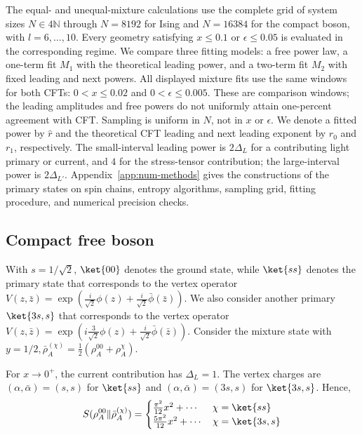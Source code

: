\documentclass[11pt]{article}
\newcommand{\ep}{\epsilon}
\newcommand{\lb}{\left(}
\newcommand{\rb}{\right)}
\begin{document}
The equal- and unequal-mixture calculations use the complete grid of system sizes
$N\in4\mathbb N$ through $N=8192$ for Ising and $N=16384$ for
the compact boson, with $l=6,\ldots,10$. Every geometry satisfying
$x\leq0.1$ or $\ep\leq0.05$ is evaluated in the corresponding regime.
We compare three fitting models: a free power law, a one-term fit
$M_1$ with the theoretical leading power, and a two-term fit $M_2$
with fixed leading and next powers. All displayed mixture
fits use the same windows for both CFTs: $0<x\leq0.02$ and
$0<\ep\leq0.005$. These are comparison windows; the leading
amplitudes and free powers do not uniformly attain one-percent
agreement with CFT. Sampling is uniform in $N$, not in $x$ or $\ep$.
We denote a fitted power by $\widehat r$ and
the theoretical CFT leading and next leading exponent by $r_0$ and $r_1$, respectively. The small-interval
leading power is $2\Delta_L$ for a contributing light primary
or current, and $4$ for the stress-tensor contribution;
the large-interval power is $2\Delta_{L'}$. Appendix~\ref{app:num-methods} gives the constructions of the primary states on spin chains,
entropy algorithms, sampling grid, fitting procedure, and numerical
precision checks.

\subsection{Compact free boson}
With $s=1/\sqrt2$, $\ket{00}$ denotes the ground state, while $\ket{ss}$ denotes the primary state that corresponds to the vertex operator $V(z,\bar z) = \exp \lb \frac{i}{\sqrt{2}}\phi(z) + \frac{i}{\sqrt{2}}\bar \phi(\bar z) \rb$. We also consider another primary $\ket{3s,s}$ that corresponds to the vertex operator $V(z,\bar z) = \exp \lb i\frac{3}{\sqrt{2}}\phi(z) + \frac{i}{\sqrt{2}}\bar \phi(\bar z) \rb$.
Consider the mixture state with $y=1/2, \bar \rho_A^{(\chi)} = \frac{1}{2}\lb \rho_A^{00} + \rho_A^\chi \rb$. 

For $x\to0^+$, the current contribution has $\Delta_L=1$.
The vertex charges are $(\alpha,\bar\alpha)=(s,s)$ for
$\ket{ss}$ and $(\alpha,\bar\alpha)=(3s,s)$ for $\ket{3s,s}$.
Hence,
\begin{align}
    S(\rho_A^{00}\| \bar \rho_A^{(\chi)}) = \begin{cases}
        \frac{\pi^2}{12} x^2 + \cdots& \chi = \ket{ss} \\
        \frac{5\pi^2 }{12}x^2+\cdots & \chi = \ket{3s,s}
    \end{cases}
\end{align}
\end{document}
